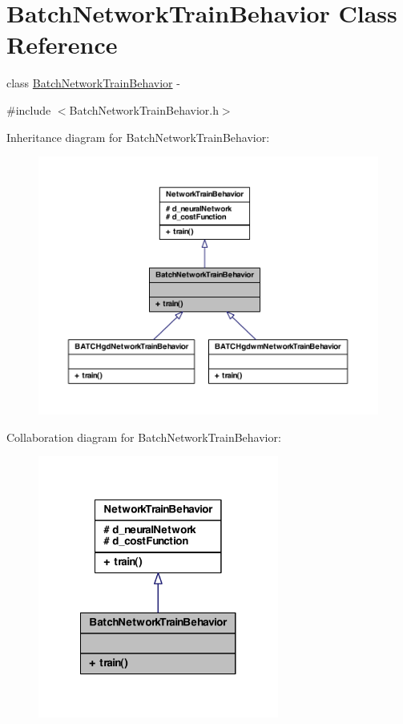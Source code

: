 \hypertarget{class_batch_network_train_behavior}{
\section{BatchNetworkTrainBehavior Class Reference}
\label{class_batch_network_train_behavior}
}


class \hyperlink{class_batch_network_train_behavior}{BatchNetworkTrainBehavior} -\/  




{\ttfamily \#include $<$BatchNetworkTrainBehavior.h$>$}



Inheritance diagram for BatchNetworkTrainBehavior:
\nopagebreak
\begin{figure}[H]
\begin{center}
\leavevmode
\includegraphics[width=400pt]{class_batch_network_train_behavior__inherit__graph}
\end{center}
\end{figure}


Collaboration diagram for BatchNetworkTrainBehavior:
\nopagebreak
\begin{figure}[H]
\begin{center}
\leavevmode
\includegraphics[width=224pt]{class_batch_network_train_behavior__coll__graph}
\end{center}
\end{figure}
